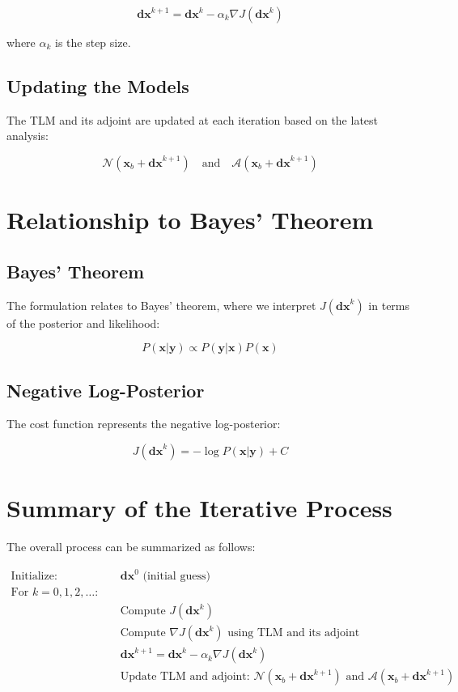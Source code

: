 \documentclass{article}
\begin{document}
\[
\mathbf{dx}^{k+1} = \mathbf{dx}^k - \alpha_k \nabla J(\mathbf{dx}^k)
\]

where \( \alpha_k \) is the step size.

\subsection{Updating the Models}
The TLM and its adjoint are updated at each iteration based on the latest analysis:

\[
\mathcal{N}(\mathbf{x}_b + \mathbf{dx}^{k+1}) \quad \text{and} \quad \mathcal{A}(\mathbf{x}_b + \mathbf{dx}^{k+1})
\]

\section{Relationship to Bayes' Theorem}

\subsection{Bayes' Theorem}
The formulation relates to Bayes' theorem, where we interpret \( J(\mathbf{dx}^k) \) in terms of the posterior and likelihood:

\[
P(\mathbf{x} | \mathbf{y}) \propto P(\mathbf{y} | \mathbf{x}) P(\mathbf{x})
\]

\subsection{Negative Log-Posterior}
The cost function represents the negative log-posterior:

\[
J(\mathbf{dx}^k) = -\log P(\mathbf{x} | \mathbf{y}) + C
\]

\section{Summary of the Iterative Process}

The overall process can be summarized as follows:

\begin{align*}
\text{Initialize:} & \quad \mathbf{dx}^0 \text{ (initial guess)} \\
\text{For } k = 0, 1, 2, \ldots: & \\
& \quad \text{Compute } J(\mathbf{dx}^k) \\
& \quad \text{Compute } \nabla J(\mathbf{dx}^k) \text{ using TLM and its adjoint} \\
& \quad \mathbf{dx}^{k+1} = \mathbf{dx}^k - \alpha_k \nabla J(\mathbf{dx}^k) \\
& \quad \text{Update TLM and adjoint: } \mathcal{N}(\mathbf{x}_b + \mathbf{dx}^{k+1}) \text{ and } \mathcal{A}(\mathbf{x}_b + \mathbf{dx}^{k+1})
\end{align*}
\end{document}
